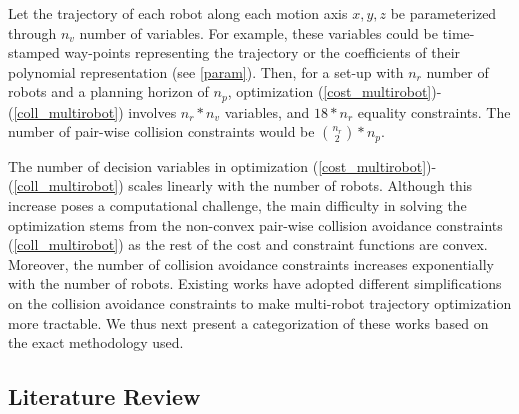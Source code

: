 Let the trajectory of each robot along each motion axis $x, y, z$ be parameterized through $n_v$ number of variables. For example, these variables could be time-stamped way-points representing the trajectory or the coefficients of their polynomial representation (see \eqref{param}). Then, for a set-up with $n_r$ number of robots and a planning horizon of $n_p$, optimization (\ref{cost_multirobot})-(\ref{coll_multirobot}) involves $n_r*n_v$ variables, and $18*n_r$ equality constraints. The number of pair-wise collision constraints would be ${n_r\choose{2}}*n_p$. 

The number of decision variables in optimization (\ref{cost_multirobot})-(\ref{coll_multirobot}) scales linearly with the number of robots. Although this increase poses a computational challenge, the main difficulty in solving the optimization stems from the non-convex pair-wise collision avoidance constraints (\ref{coll_multirobot}) as the rest of the cost and constraint functions are convex. Moreover, the number of collision avoidance constraints increases exponentially with the number of robots. Existing works  \citep{rafaella_scp,aks_ral21, incremental_scp_how, priority_seq, park2020efficient} have adopted different simplifications on the collision avoidance constraints to make multi-robot trajectory optimization more tractable. We thus next present a categorization of these works based on the exact methodology used.

\subsection{Literature Review}
